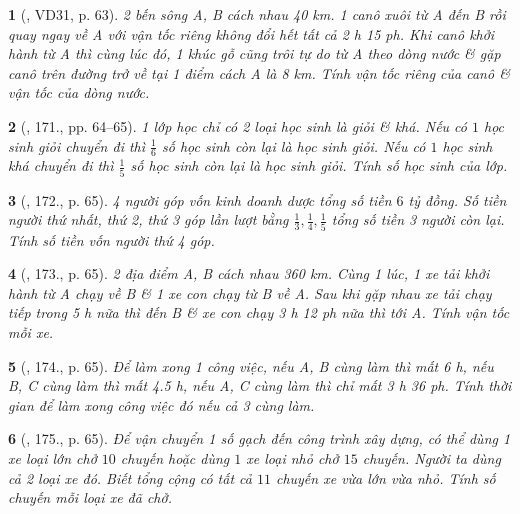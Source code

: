 \documentclass{article}
\newtheorem{baitoan}{}
\begin{document}
\begin{baitoan}[\cite{Tuyen_Toan_9_old}, VD31, p. 63]
	2 bến sông A, B cách nhau {\rm40 km}. 1 canô xuôi từ A đến B rồi quay ngay về A với vận tốc riêng không đổi hết tất cả {\rm2 h 15 ph}. Khi canô khởi hành từ A thì cùng lúc đó, 1 khúc gỗ cũng trôi tự do từ A theo dòng nước \& gặp canô trên đường trở về tại 1 điểm cách A là {\rm8 km}. Tính vận tốc riêng của canô \& vận tốc của dòng nước.
\end{baitoan}

\begin{baitoan}[\cite{Tuyen_Toan_9_old}, 171., pp. 64--65]
	1 lớp học chỉ có 2 loại học sinh là giỏi \& khá. Nếu có $1$ học sinh giỏi chuyển đi thì $\frac{1}{6}$ số học sinh còn lại là học sinh giỏi. Nếu có $1$ học sinh khá chuyển đi thì $\frac{1}{5}$ số học sinh còn lại là học sinh giỏi. Tính số học sinh của lớp.
\end{baitoan}

\begin{baitoan}[\cite{Tuyen_Toan_9_old}, 172., p. 65]
	4 người góp vốn kinh doanh dược tổng số tiền $6$ tỷ đồng. Số tiền người thứ nhất, thứ 2, thứ 3 góp lần lượt bằng $\frac{1}{3},\frac{1}{4},\frac{1}{5}$ tổng số tiền 3 người còn lại. Tính số tiền vốn người thứ 4 góp.
\end{baitoan}

\begin{baitoan}[\cite{Tuyen_Toan_9_old}, 173., p. 65]
	2 địa điểm A, B cách nhau {\rm360 km}. Cùng 1 lúc, 1 xe tải khởi hành từ A chạy về B \& 1 xe con chạy từ B về A. Sau khi gặp nhau xe tải chạy tiếp trong {\rm5 h} nữa thì đến B \& xe con chạy {\rm3 h 12 ph} nữa thì tới A. Tính vận tốc mỗi xe.
\end{baitoan}

\begin{baitoan}[\cite{Tuyen_Toan_9_old}, 174., p. 65]
	Để làm xong 1 công việc, nếu A, B cùng làm thì mất {\rm6 h}, nếu B, C cùng làm thì mất {\rm4.5 h}, nếu A, C cùng làm thì chỉ mất {\rm3 h 36 ph}. Tính thời gian để làm xong công việc đó nếu cả 3 cùng làm.
\end{baitoan}

\begin{baitoan}[\cite{Tuyen_Toan_9_old}, 175., p. 65]
	Để vận chuyển 1 số gạch đến công trình xây dựng, có thể dùng 1 xe loại lớn chở $10$ chuyến hoặc dùng $1$ xe loại nhỏ chở $15$ chuyến. Người ta dùng cả 2 loại xe đó. Biết tổng cộng có tất cả $11$ chuyến xe vừa lớn vừa nhỏ. Tính số chuyến mỗi loại xe đã chở.
\end{baitoan}
\end{document}
